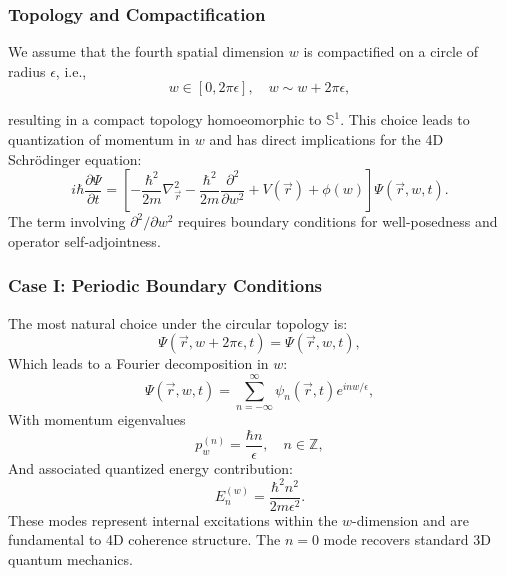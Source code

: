 \documentclass[12pt]{article}
\begin{document}
\subsubsection*{Topology and Compactification}

We assume that the fourth spatial dimension \(w\) is compactified on a circle of radius \(\epsilon\), i.e.,
\begin{equation}
w \in [0, 2\pi\epsilon], \quad w \sim w + 2\pi\epsilon,
\end{equation}

resulting in a compact topology homoeomorphic to \(\mathbb{S}^1\). This choice leads to quantization of momentum in \(w\) and has direct implications for the 4D Schrödinger equation:
\begin{equation}
i\hbar \frac{\partial \Psi}{\partial t} = \left[ -\frac{\hbar^2}{2m} \nabla_{\vec{r}}^2 - \frac{\hbar^2}{2m} \frac{\partial^2}{\partial w^2} + V(\vec{r}) + \phi(w) \right] \Psi(\vec{r}, w, t).
\label{eq:4d_schrodinger_w}
\end{equation}
The term involving \(\partial^2/\partial w^2\) requires boundary conditions for well-posedness and operator self-adjointness.

\subsubsection*{Case I: Periodic Boundary Conditions}

The most natural choice under the circular topology is:
\begin{equation}
\Psi(\vec{r}, w + 2\pi\epsilon, t) = \Psi(\vec{r}, w, t),
\label{eq:periodic_bc_w}
\end{equation}
Which leads to a Fourier decomposition in \(w\):
\begin{equation}
\Psi(\vec{r}, w, t) = \sum_{n=-\infty}^{\infty} \psi_n(\vec{r}, t) e^{i n w / \epsilon},
\label{eq:fourier_decomposition_w}
\end{equation}
With momentum eigenvalues
\begin{equation}
p_w^{(n)} = \frac{\hbar n}{\epsilon}, \quad n \in \mathbb{Z},
\end{equation}
And associated quantized energy contribution:
\begin{equation}
E_n^{(w)} = \frac{\hbar^2 n^2}{2m \epsilon^2}.
\label{eq:w_energy_levels}
\end{equation}
These modes represent internal excitations within the \(w\)-dimension and are fundamental to 4D coherence structure. The \(n = 0\) mode recovers standard 3D quantum mechanics.
\end{document}
